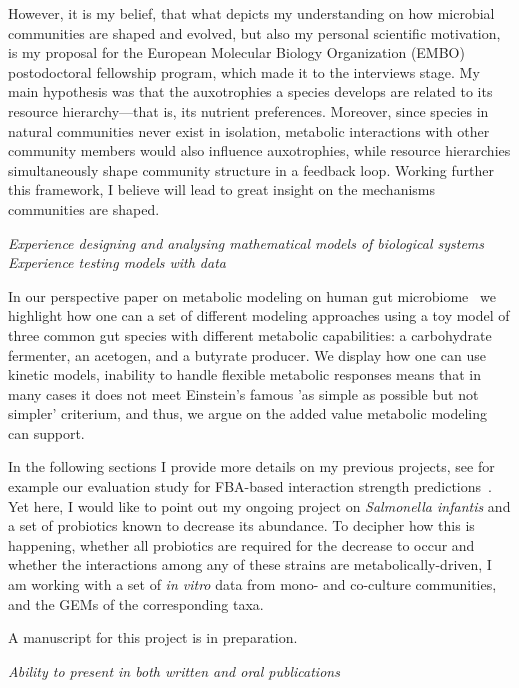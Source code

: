     However, it is my belief, that what depicts my understanding on how microbial communities are shaped and evolved, 
    but also my personal scientific motivation, is my proposal for the
    European Molecular Biology Organization (EMBO) postodoctoral fellowship program,
    which made it to the interviews stage. 
    My main hypothesis was that the auxotrophies a species develops are
    related to its resource hierarchy—that is, its nutrient preferences. 
    Moreover, since species in natural communities never exist in isolation, 
    metabolic interactions with other community members would also influence auxotrophies, 
    while resource hierarchies simultaneously shape community structure in a feedback loop.
    Working further this framework, I believe will lead to great insight on the mechanisms communities are shaped. 

\textit{Experience designing and analysing mathematical models of biological systems}
\textit{Experience testing models with data}

    In our perspective paper on metabolic modeling on human gut microbiome~\cite{garza2023metabolic}
    we highlight how one can a set of different modeling approaches using a toy model of three common 
    gut species with different metabolic capabilities: a carbohydrate fermenter, an acetogen, 
    and a butyrate producer.
    We display how one can use kinetic models, 
    inability to handle flexible metabolic responses means that in many cases it does not meet
    Einstein's famous 'as simple as possible but not simpler' criterium,
    and thus, we argue on the added value metabolic modeling can support. 

    In the following sections I provide more details on my previous projects, see for example our evaluation study 
    for FBA-based interaction strength predictions~\cite{joseph2024predicting}.
    Yet here, I would like to point out my
    ongoing project on \textit{Salmonella infantis} and a set of probiotics known to decrease its abundance.
    To decipher how this is happening, whether all probiotics are required for the decrease to occur  
    and whether the interactions among any of these strains are metabolically-driven,
    I am working with a set of \textit{in vitro} data from mono- and co-culture communities, 
    and the GEMs of the corresponding taxa. 

    A manuscript for this project is in preparation.


\textit{Ability to present in both written and oral publications}

